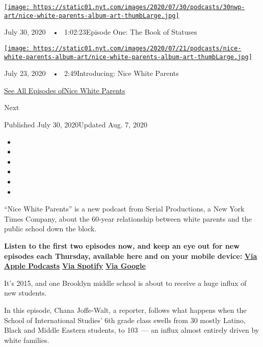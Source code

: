 \href{https://www.nytimes.com/2020/07/30/podcasts/nice-white-parents-serial.html?action=click\&module=audio-series-bar\&region=header\&pgtype=Article}{\texttt{[image: https://static01.nyt.com/images/2020/07/30/podcasts/30nwp-art/nice-white-parents-album-art-thumbLarge.jpg]}}

July 30, 2020~~•~ 1:02:23Episode One: The Book of Statuses

\href{https://www.nytimes.com/2020/07/23/podcasts/nice-white-parents-serial.html?action=click\&module=audio-series-bar\&region=header\&pgtype=Article}{\texttt{[image: https://static01.nyt.com/images/2020/07/21/podcasts/nice-white-parents-album-art/nice-white-parents-album-art-thumbLarge.jpg]}}

July 23, 2020~~•~ 2:49Introducing: Nice White Parents

\href{https://www.nytimes.com/column/nice-white-parents}{See All
Episodes ofNice White Parents}

Next

Published July 30, 2020Updated Aug. 7, 2020

\begin{itemize}
\item
\item
\item
\item
\item
\item
\end{itemize}

``Nice White Parents'' is a new podcast from Serial Productions, a New
York Times Company, about the 60-year relationship between white parents
and the public school down the block.

\textbf{Listen to the first two episodes now, and keep an eye out for
new episodes each Thursday, available here and on your mobile device:}
\textbf{\href{https://podcasts.apple.com/us/podcast/nice-white-parents/id1524080195}{Via
Apple Podcasts}} \textbf{\textbar{}}
\textbf{\href{https://open.spotify.com/show/7oBSLCZFCgpdCaBjIG8mLV?si=YcEPLD3xT2ejXmpQz-tRpw}{Via
Spotify}} \textbf{\textbar{}}
\textbf{\href{https://podcasts.google.com/feed/aHR0cHM6Ly9yc3MuYXJ0MTkuY29tL25pY2Utd2hpdGUtcGFyZW50cw}{Via
Google}}

It's 2015, and one Brooklyn middle school is about to receive a huge
influx of new students.

In this episode, Chana Joffe-Walt, a reporter, follows what happens when
the School of International Studies' 6th grade class swells from 30
mostly Latino, Black and Middle Eastern students, to 103~--- an influx
almost entirely driven by white families.


